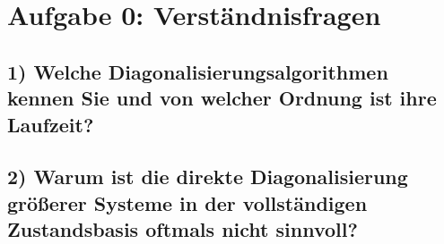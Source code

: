 \setcounter{secnumdepth}{0}
\section{Aufgabe 0: Verständnisfragen}
\label{sec:auf0}

\subsection{1) Welche Diagonalisierungsalgorithmen kennen Sie und von welcher Ordnung ist ihre Laufzeit?}

\subsection{2) Warum ist die direkte Diagonalisierung größerer Systeme in der vollständigen Zustandsbasis oftmals nicht sinnvoll?}